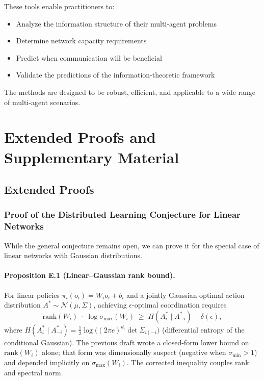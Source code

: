 \documentclass[10pt, letterpaper]{article}
\begin{document}
These tools enable practitioners to:
\begin{itemize}
    \item Analyze the information structure of their multi-agent problems
    \item Determine network capacity requirements
    \item Predict when communication will be beneficial
    \item Validate the predictions of the information-theoretic framework
\end{itemize}

The methods are designed to be robust, efficient, and applicable to a wide range of multi-agent scenarios.

\section{Extended Proofs and Supplementary Material}
\label{app:extended}

\subsection{Extended Proofs}

\subsubsection{Proof of the Distributed Learning Conjecture for Linear Networks}

While the general conjecture remains open, we can prove it for the special case of linear networks with Gaussian distributions.

\paragraph{Proposition E.1 (Linear--Gaussian rank bound).} For linear policies $\pi_i(o_i) = W_i o_i + b_i$ and a jointly Gaussian optimal action distribution $A^* \sim \mathcal{N}(\mu, \Sigma)$, achieving $\epsilon$-optimal coordination requires
\[\mathrm{rank}(W_i) \;\cdot\; \log \sigma_{\max}(W_i) \;\geq\; H(A_i^* \mid A_{-i}^*) - \delta(\epsilon),\]
where $H(A_i^* \mid A_{-i}^*) = \tfrac{1}{2}\log\!\bigl((2\pi e)^{d_i} \det \Sigma_{i\mid -i}\bigr)$ (differential entropy of the conditional Gaussian). The previous draft wrote a closed-form lower bound on $\mathrm{rank}(W_i)$ alone; that form was dimensionally suspect (negative when $\sigma_{\min} > 1$) and depended implicitly on $\sigma_{\max}(W_i)$. The corrected inequality couples rank and spectral norm.
\end{document}
